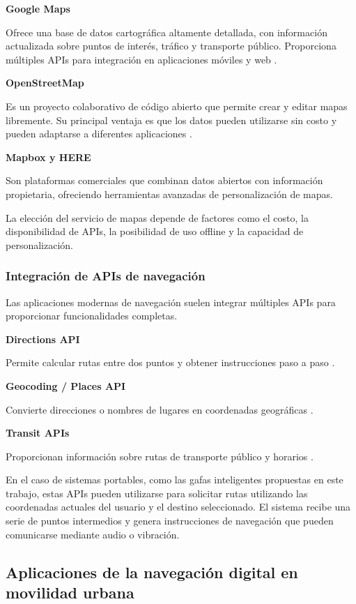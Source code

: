 \textbf{Google Maps}

Ofrece una base de datos cartográfica altamente detallada, con información actualizada sobre puntos de interés, tráfico y transporte público. Proporciona múltiples APIs para integración en aplicaciones móviles y web \cite{google_directions_api}.

\textbf{OpenStreetMap}

Es un proyecto colaborativo de código abierto que permite crear y editar mapas libremente. Su principal ventaja es que los datos pueden utilizarse sin costo y pueden adaptarse a diferentes aplicaciones \cite{haklay2008osm}.

\textbf{Mapbox y HERE}

Son plataformas comerciales que combinan datos abiertos con información propietaria, ofreciendo herramientas avanzadas de personalización de mapas.

La elección del servicio de mapas depende de factores como el costo, la disponibilidad de APIs, la posibilidad de uso offline y la capacidad de personalización.

\subsubsection{Integración de APIs de navegación}

Las aplicaciones modernas de navegación suelen integrar múltiples APIs para proporcionar funcionalidades completas.

\textbf{Directions API}

Permite calcular rutas entre dos puntos y obtener instrucciones paso a paso \cite{google_directions_api}.

\textbf{Geocoding / Places API}

Convierte direcciones o nombres de lugares en coordenadas geográficas \cite{google_directions_api}.

\textbf{Transit APIs}

Proporcionan información sobre rutas de transporte público y horarios \cite{gtfs2024spec}.

En el caso de sistemas portables, como las gafas inteligentes propuestas en este trabajo, estas APIs pueden utilizarse para solicitar rutas utilizando las coordenadas actuales del usuario y el destino seleccionado. El sistema recibe una serie de puntos intermedios y genera instrucciones de navegación que pueden comunicarse mediante audio o vibración.

\subsection{Aplicaciones de la navegación digital en movilidad urbana}

